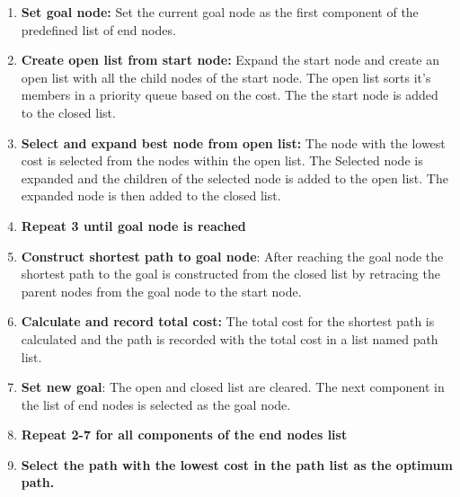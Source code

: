 \begin{enumerate}
\item \textbf{Set goal node:} Set the current goal node as the first component of the predefined list of end nodes. 
\item \textbf{Create open list from start node:} Expand the start node and create an open list with all the child nodes of the start node. The open list sorts it's members in a priority queue based on the cost. The the start node is added to the closed list.
\item \textbf{Select and expand best node from open list:} The node with the lowest cost is selected from the nodes within the open list. The Selected node is expanded and the children of the selected node is added to the open list. The expanded node is then added to the closed list.
\item \textbf{Repeat 3 until goal node is reached}
\item \textbf{Construct shortest path to goal node}: After reaching the goal node the shortest path to the goal is constructed from the closed list by retracing the parent nodes from the goal node to the start node.
\item \textbf{Calculate and record total cost:} The total cost for the shortest path is calculated and the path is recorded with the total cost in a list named path list.
\item \textbf{Set new goal}: The open and closed list are cleared. The next component in the list of end nodes is selected as the goal node.
\item \textbf{Repeat 2-7 for all components of the end nodes list}
\item \textbf{Select the path with the lowest cost in the path list as the optimum path.}
\end{enumerate}